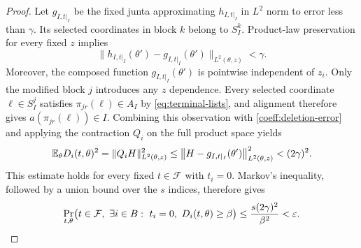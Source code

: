 \begin{proof}
Let $g_{I,t|_I}$ be the fixed junta approximating $h_{I,t|_I}$ in
$L^2$ norm to error less than $\gamma$.  Its selected coordinates in
block $k$ belong to $S_I^k$.  Product-law preservation for every fixed
$z$ implies
\[
 \big\|h_{I,t|_I}(\theta')-g_{I,t|_I}(\theta')\big\|_{L^2(\theta,z)}
 <\gamma.
\]
Moreover, the composed function $g_{I,t|_I}(\theta')$ is pointwise
independent of $z_i$.  Only the modified block $j$ introduces any $z$
dependence.  Every selected coordinate $\ell\in S_I^j$ satisfies
$\pi_{jr}(\ell)\in A_I$ by \eqref{eq:terminal-lists}, and alignment
therefore gives $a(\pi_{jr}(\ell))\in I$.  Combining this observation
with \eqref{coeff:deletion-error} and applying the contraction $Q_i$
on the full product space yields
\begin{equation}\label{coeff:zero-bound}
 \mathbb E_\theta D_i(t,\theta)^2
 =\|Q_iH\|_{L^2(\theta,z)}^2
 \le
 \big\|H-g_{I,t|_I}(\theta')\big\|_{L^2(\theta,z)}^2
 <(2\gamma)^2.
\end{equation}
This estimate holds for every fixed $t\in\mathcal F$ with $t_i=0$.
Markov's inequality, followed by a union bound over the $s$ indices,
therefore gives
\begin{equation}\label{coeff:zero-probability}
 \Pr_{t,\theta}\bigl(
 t\in\mathcal F,\ 
 \exists i\in B:\ t_i=0,\ D_i(t,\theta)\ge\beta
 \bigr)
 \le \frac{s(2\gamma)^2}{\beta^2}<\eps.
\end{equation}


\end{proof}
